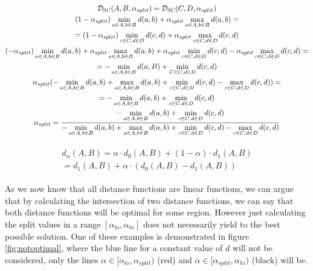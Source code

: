 \begin{equation}
    \begin{aligned}
        \begin{gathered}
        \mathcal{D}_\text{SC}(A,B,\alpha_{split}) = \mathcal{D}_\text{SC}(C,D,\alpha_{split})\\
        (1 - \alpha_{split}) \min\limits_{a \in A, b \in B} d(a,b) + \alpha_{split} \max\limits_{a \in A, b \in B} d(a,b) = \\
        = (1 - \alpha_{split}) \min\limits_{c \in C, d \in D} d(c,d) + \alpha_{split} \max\limits_{c \in C, d \in D} d(c,d)\\
        (- \alpha_{split}) \min\limits_{a \in A, b \in B} d(a,b) + \alpha_{split} \max\limits_{a \in A, b \in B} d(a,b) + \alpha_{split} \min\limits_{c \in C, d \in D} d(c,d) - \alpha_{split} \max\limits_{c \in C, d \in D} d(c,d) =\\
        = - \min\limits_{a \in A, b \in B} d(a,B) + \min\limits_{C \in C, d \in D} d(c,d)\\
        \alpha_{split} (- \min\limits_{a \in A, b \in B} d(a,b) + \max\limits_{a \in A, b \in B} d(a,b) + \min\limits_{c \in C, d \in D} d(c,d) - \max\limits_{c \in C, d \in D} d(c,d)) =\\
        = - \min\limits_{a \in A, b \in B} d(a,b) + \min\limits_{c \in C, d \in D} d(c,d)\\
        \alpha_{split} = \frac{- \min\limits_{a \in A, b \in B} d(a,b) + \min\limits_{c \in C, d \in D} d(c,d)}{- \min\limits_{a \in A, b \in B} d(a,b) + \max\limits_{a \in A, b \in B} d(a,b) + \min\limits_{c \in C, d \in D} d(c,d) - \max\limits_{c \in C, d \in D} d(c,d)}
    \end{gathered}
    \end{aligned}
    \label{eq:equalizesc}
\end{equation}

\begin{equation}
    \begin{aligned}
        \begin{gathered}
        d_\alpha(A,B) = \alpha \cdot d_0(A,B) + (1-\alpha) \cdot d_1(A,B)\\
        = d_1(A,B) + \alpha \cdot (d_0(A,B) - d_1(A,B))
        \end{gathered}
    \end{aligned}
    \label{eq:linear}
\end{equation}

As we now know that all distance functions are linear functions, we can argue that by calculating the intersection of two distance functions, we can say that both distance functions will be optimal for some region. However just calculating the split values in a range $[\alpha_{lo}, \alpha_{hi}]$ does not necessarily yield to the best possible solution. One of these examples is demonstrated in figure \ref{fig:notoptimal}, where the blue line for a constant value of $d$ will not be considered, only the lines $\alpha \in [\alpha_{lo}, \alpha_{split})$ (red) and $\alpha \in [\alpha_{split}, \alpha_{hi})$ (black) will be.

